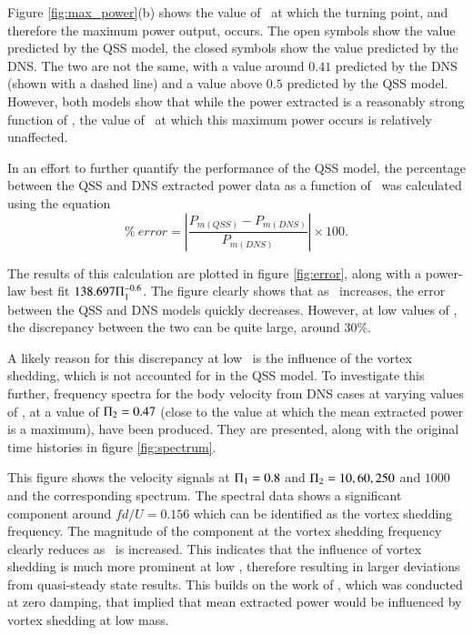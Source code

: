 Figure \ref{fig:max_power}(b) shows the value of \massdamp\ at which the turning point, and therefore the maximum power output, occurs. The open symbols show the value predicted by the QSS model, the closed symbols show the value predicted by the DNS. The two are not the same, with a value around $0.41$ predicted by the DNS (shown with a dashed line) and a value above $0.5$ predicted by the QSS model. However, both models show that while the power extracted is a reasonably strong function of \massstiff, the value of \massdamp\ at which this maximum power occurs is relatively unaffected.

In an effort to further quantify the performance of the QSS model, the percentage between the QSS and DNS extracted power data as a function of \massstiff\ was calculated using the equation
 \begin{equation}   \label{eqn:error_calculation} 
 \% \ error=\left|{\frac{P_{m(QSS)} - P_{m(DNS)}}{P_{m(DNS)}}}\right| \times 100.
 \end{equation}

The results of this calculation are plotted in figure \ref{fig:error}, along with a power-law best fit $138.697\Pi_1^{-0.6}$. The figure clearly shows that as \massstiff \ increases, the error between the QSS and DNS models quickly decreases. However, at low values of \massstiff, the discrepancy between the two can be quite large, around $30\%$.



A likely reason for this discrepancy at low \massstiff\ is the influence of the vortex shedding, which is not accounted for in the QSS model. To investigate this further, frequency spectra for the body velocity from DNS cases at varying values of \massstiff, at a value of $\Pi_2=0.47$ (close to the value at which the mean extracted power is a maximum), have been produced. They are presented, along with the original time histories in figure \ref{fig:spectrum}.


 
This figure shows the  velocity signals at $\Pi_1=0.8$ and $\Pi_2= 10, 60, 250$ and $1000$ and the corresponding spectrum. The spectral data shows a significant component around $fd/U=0.156$ which can be identified as the vortex shedding frequency. The magnitude of the component at the vortex shedding frequency clearly reduces as \massstiff\ is increased. This indicates that the influence of vortex shedding is much more prominent at low \massstiff,  therefore resulting in larger deviations from quasi-steady state results. This builds on the work of \cite{Joly2012}, which was conducted at zero damping, that implied that mean extracted power would be influenced by vortex shedding at low mass.

